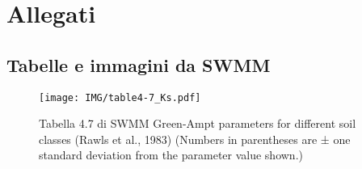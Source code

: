 \appendix
\chapter{Allegati}
\label{appendix:SWMM}
\section{Tabelle e immagini da SWMM}
\begin{figure}[H]
    \centering
    \texttt{[image: IMG/table4-7\_Ks.pdf]} 
    \caption[Tabella 4.7 di SWMM]{Tabella 4.7 di SWMM Green-Ampt parameters for different soil classes (Rawls et al., 1983) (Numbers in parentheses are ± one standard deviation from the parameter value shown.)}
    \label{SWMM:tabella4-7}
\end{figure}

%
